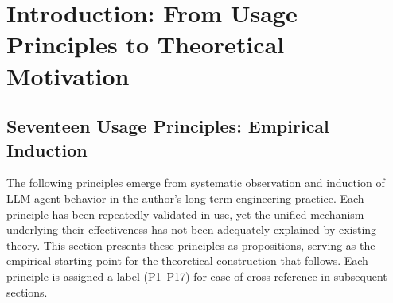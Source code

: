 \documentclass[11pt,a4paper]{article}
\theoremstyle{definition}
\begin{document}
\begin{abstract}
The primary contributions of this paper are: (1) a dual-mode classification of training convergence and test convergence that unifies agent behavior under a single convergence-constraint framework; (2) a proof, from the structural difference of the two memory types, that no intermediate transitional memory structure exists between the long and the short term; (3) a syllogistic demonstration that the unreliability of context-driven decomposition decisions is not an empirical contingency but a structural necessity; (4) a theory of preference-driven iteration for divergent tasks, forming a dual to the theory of convergent tasks; and (5) a systematic derivation, from the structural deficiencies of agents, of the constitutive role of the human operator in human-AI collaboration, together with an explicit delineation of the feasible design space.

The paper employs a six-tier hierarchy of argument strength---rigorous tier, definitional tier, formal-demonstrative tier, conceptual-constructive tier, analogical tier, and empirical-inferential tier---with the tier of each section explicitly labeled in the text. No conceptual construction is presented under the guise of a mathematical theorem.
\end{abstract}

\newpage
\tableofcontents
\newpage

\section{Introduction: From Usage Principles to Theoretical Motivation}
\label{sec:intro}

\subsection{Seventeen Usage Principles: Empirical Induction}

The following principles emerge from systematic observation and induction of LLM agent behavior in the author's long-term engineering practice. Each principle has been repeatedly validated in use, yet the unified mechanism underlying their effectiveness has not been adequately explained by existing theory. This section presents these principles as propositions, serving as the empirical starting point for the theoretical construction that follows. Each principle is assigned a label (P1--P17) for ease of cross-reference in subsequent sections.
\end{document}
